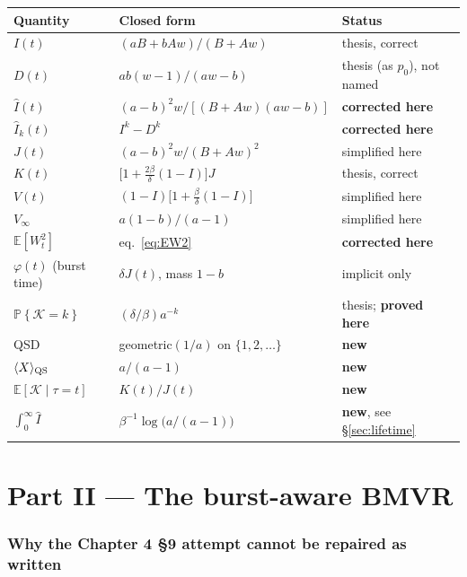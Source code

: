 \documentclass[11pt]{article}
\newcommand{\E}{\mathbb{E}}
\newcommand{\Prob}[1]{\mathbb{P}\!\left\{#1\right\}}
\newcommand{\wt}{W_t}
\newcommand{\Ihat}{\widehat{I}}
\newcommand{\Kb}{\mathcal{K}}
\newcommand{\Aa}{A}
\newcommand{\Bb}{B}
\theoremstyle{plain}
\theoremstyle{definition}
\theoremstyle{remark}
\begin{document}
\begin{center}
\renewcommand{\arraystretch}{1.45}
\begin{tabular}{@{}lll@{}}
\toprule
Quantity & Closed form & Status \\
\midrule
$I(t)$ & $(a\Bb+b\Aa w)/(\Bb+\Aa w)$ & thesis, correct \\
$D(t)$ & $ab(w-1)/(aw-b)$ & thesis (as $p_0$), not named \\
$\Ihat(t)$ & $(a-b)^2w/[(\Bb+\Aa w)(aw-b)]$ & \textbf{corrected here} \\
$\Ihat_k(t)$ & $I^k-D^k$ & \textbf{corrected here} \\
$J(t)$ & $(a-b)^2w/(\Bb+\Aa w)^2$ & simplified here \\
$K(t)$ & $\bigl[1+\tfrac{2\beta}{\delta}(1-I)\bigr]J$ & thesis, correct \\
$V(t)$ & $(1-I)\bigl[1+\tfrac{\beta}{\delta}(1-I)\bigr]$ & simplified here \\
$V_\infty$ & $a(1-b)/(a-1)$ & simplified here \\
$\E[\wt^2]$ & eq.~\eqref{eq:EW2} & \textbf{corrected here} \\
$\varphi(t)$ (burst time) & $\delta J(t)$, mass $1-b$ & implicit only \\
$\Prob{\Kb=k}$ & $(\delta/\beta)a^{-k}$ & thesis; \textbf{proved here} \\
QSD & geometric$(1/a)$ on $\{1,2,\dots\}$ & \textbf{new} \\
$\langle X\rangle_{\rm QS}$ & $a/(a-1)$ & \textbf{new} \\
$\E[\Kb\mid\tau=t]$ & $K(t)/J(t)$ & \textbf{new} \\
$\int_0^\infty\Ihat$ & $\beta^{-1}\log\bigl(a/(a-1)\bigr)$ & \textbf{new}, see \S\ref{sec:lifetime} \\
\bottomrule
\end{tabular}
\end{center}

\part*{Part II --- The burst-aware BMVR}

\section{Why the Chapter 4 \S9 attempt cannot be repaired as written}
\end{document}
